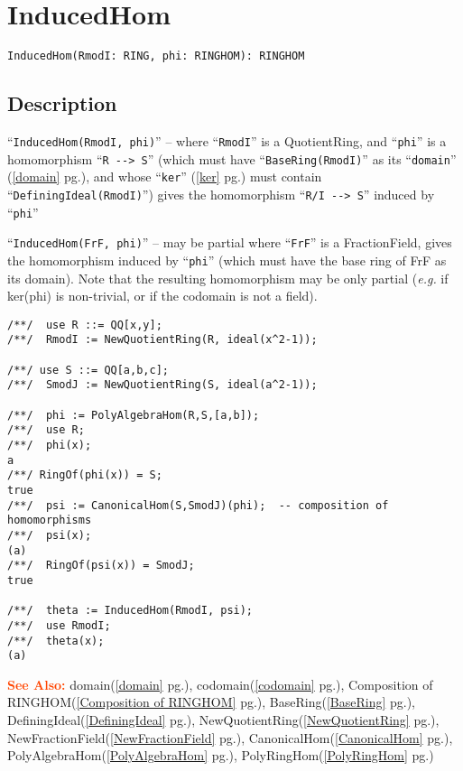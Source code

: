 \documentclass[a4paper]{mybook}
\newenvironment{command}{}{} %
\newcommand\SeeAlso{\par\textcolor{OrangeRed}{\textbf{\large See Also: }}}
\begin{document}
\section{InducedHom}
\label{InducedHom}
\begin{command} %


\begin{Verbatim}[label=syntax, rulecolor=\color{MidnightBlue},
frame=single]
InducedHom(RmodI: RING, phi: RINGHOM): RINGHOM
\end{Verbatim}


\subsection*{Description}

``\verb&InducedHom(RmodI, phi)&'' -- where ``\verb&RmodI&'' is a QuotientRing,
and ``\verb&phi&'' is a homomorphism ``\verb&R --> S&''
(which must have ``\verb&BaseRing(RmodI)&'' as its ``\verb&domain&'' (\ref{domain} pg.\pageref{domain}),
and whose ``\verb&ker&'' (\ref{ker} pg.\pageref{ker}) must contain ``\verb&DefiningIdeal(RmodI)&'')
gives the homomorphism ``\verb&R/I --> S&'' induced by ``\verb&phi&''
\par 
``\verb&InducedHom(FrF, phi)&'' -- may be partial where ``\verb&FrF&'' is a
FractionField, gives the homomorphism induced by ``\verb&phi&'' (which must
have the base ring of FrF as its domain).  Note that the resulting
homomorphism may be only partial (\textit{e.g.} if ker(phi) is non-trivial,
or if the codomain is not a field).
\begin{Verbatim}[label=example, rulecolor=\color{PineGreen}, frame=single]
/**/  use R ::= QQ[x,y];
/**/  RmodI := NewQuotientRing(R, ideal(x^2-1));

/**/ use S ::= QQ[a,b,c];
/**/  SmodJ := NewQuotientRing(S, ideal(a^2-1));

/**/  phi := PolyAlgebraHom(R,S,[a,b]);
/**/  use R;
/**/  phi(x);
a
/**/ RingOf(phi(x)) = S;
true
/**/  psi := CanonicalHom(S,SmodJ)(phi);  -- composition of homomorphisms
/**/  psi(x);
(a)
/**/  RingOf(psi(x)) = SmodJ;
true

/**/  theta := InducedHom(RmodI, psi);
/**/  use RmodI;
/**/  theta(x);
(a)
\end{Verbatim}


\SeeAlso %
  domain(\ref{domain} pg.\pageref{domain}), 
    codomain(\ref{codomain} pg.\pageref{codomain}), 
    Composition of RINGHOM(\ref{Composition of RINGHOM} pg.\pageref{Composition of RINGHOM}), 
    BaseRing(\ref{BaseRing} pg.\pageref{BaseRing}), 
    DefiningIdeal(\ref{DefiningIdeal} pg.\pageref{DefiningIdeal}), 
    NewQuotientRing(\ref{NewQuotientRing} pg.\pageref{NewQuotientRing}), 
    NewFractionField(\ref{NewFractionField} pg.\pageref{NewFractionField}), 
    CanonicalHom(\ref{CanonicalHom} pg.\pageref{CanonicalHom}), 
    PolyAlgebraHom(\ref{PolyAlgebraHom} pg.\pageref{PolyAlgebraHom}), 
    PolyRingHom(\ref{PolyRingHom} pg.\pageref{PolyRingHom})
\end{command} %
\end{document}
